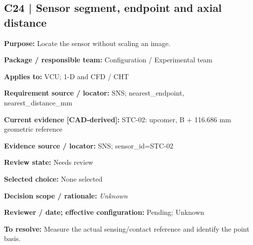 \documentclass[11pt]{article}
\begin{document}
\begin{minipage}{\textwidth}\small\setlength{\parskip}{2pt}
\subsection*{C24 | Sensor segment, endpoint and axial distance}
\textbf{Purpose:} Locate the sensor without scaling an image.\par
\textbf{Package / responsible team:} Configuration / Experimental team\par
\textbf{Applies to:} VCU; 1-D and CFD / CHT\par
\textbf{Requirement source / locator:} SNS; nearest\_\allowbreak{}endpoint, nearest\_\allowbreak{}distance\_\allowbreak{}mm\par
\textbf{Current evidence [CAD-derived]:} STC-02: upcomer, B + 116.686 mm geometric reference\par
\textbf{Evidence source / locator:} SNS; sensor\_\allowbreak{}id=STC-02\par
\textbf{Review state:} Needs review\par
\textbf{Selected choice:} None selected\par
\textbf{Decision scope / rationale:} \textit{Unknown}\par
\textbf{Reviewer / date; effective configuration:} Pending; Unknown\par
\textbf{To resolve:} Measure the actual sensing/contact reference and identify the point basis.\par
\end{minipage}\par\vspace{5pt}
\end{document}
